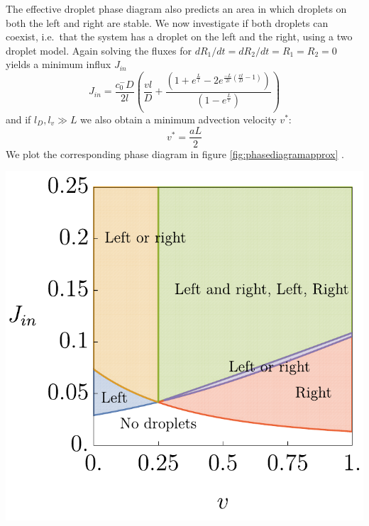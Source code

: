 \documentclass{Dissertate}
\let\origfigure\figure
\let\endorigfigure\endfigure
\renewenvironment{figure}[1][2] {
    \expandafter\origfigure\expandafter[H]
} {
    \endorigfigure
}
\begin{document}
The effective droplet phase diagram also predicts an area in which
droplets on both the left and right are stable. We now investigate if
both droplets can coexist, i.e.~that the system has a droplet on the
left and the right, using a two droplet model. Again solving the fluxes
for \(dR_1/dt=dR_2/dt=R_1=R_2=0\) yields a minimum influx \(J_{in}\) \[
J_{in} = \frac{c_0^-D}{2l}\left(\frac{vl}{D}+\frac{(1+e^{\frac{L}{l}}-2e^{\frac{-L}{2l}(\frac{vl}{D}-1)})}{(1-e^{\frac{L}{l}})}\right)
\] and if \(l_D,l_v\gg L\) we also obtain a minimum advection velocity
\(v^*\): \begin{equation}
v^*=\frac{aL}{2}
\label{eq:minadv}\end{equation} We plot the corresponding phase diagram
in figure \ref{fig:phasediagramapprox} .

\begin{figure}
\hypertarget{fig:phasediagramapprox}{%
\centering
\includegraphics{source/figures/pdf/phaseapprox.pdf}
\caption{Caption.}\label{fig:phasediagramapprox}
}
\end{figure}
\end{document}
